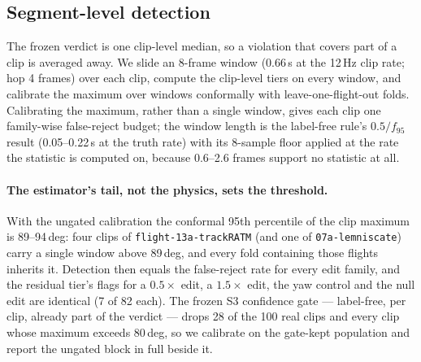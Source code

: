 
\subsection{Segment-level detection}
\label{sec:g01-segments}

The frozen verdict is one clip-level median, so a violation that covers part of a clip is
averaged away. We slide an 8-frame window (0.66\,s at the 12\,Hz clip rate; hop 4 frames) over
each clip, compute the clip-level tiers on every window, and calibrate the maximum over windows
conformally with leave-one-flight-out folds. Calibrating the maximum, rather than a single
window, gives each clip one family-wise false-reject budget; the window length is the
label-free rule's \mbox{$0.5/f_{95}$} result (0.05--0.22\,s at the truth rate) with its
8-sample floor applied at the rate the statistic is computed on, because 0.6--2.6 frames
support no statistic at all.

\paragraph{The estimator's tail, not the physics, sets the threshold.} With the ungated
calibration the conformal 95th percentile of the clip maximum is 89--94\,deg: four clips of
\texttt{flight-13a-trackRATM} (and one of \texttt{07a-lemniscate}) carry a single window above
89\,deg, and every fold containing those flights inherits it. Detection then equals the
false-reject rate for every edit family, and the residual tier's flags for a $0.5\times$ edit,
a $1.5\times$ edit, the yaw control and the null edit are identical (7 of 82 each). The frozen
S3 confidence gate --- label-free, per clip, already part of the verdict --- drops 28 of the
100 real clips and every clip whose maximum exceeds 80\,deg, so we calibrate on the gate-kept
population and report the ungated block in full beside it.

